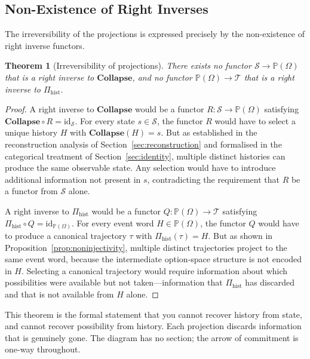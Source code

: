 \documentclass[12pt]{article}
\theoremstyle{plain}
\newtheorem{theorem}{Theorem}[section]
\theoremstyle{definition}
\theoremstyle{remark}
\newcommand{\Collapse}{\mathbf{Collapse}}
\newcommand{\PathCat}{\mathbb{P}(\Omega)}
\begin{document}
\subsection{Non-Existence of Right Inverses}

The irreversibility of the projections is expressed precisely by the
non-existence of right inverse functors.

\begin{theorem}[Irreversibility of projections]
\label{thm:no-right-inverse}
There exists no functor $\mathcal{S} \to \PathCat$ that is a right inverse
to $\Collapse$, and no functor $\PathCat \to \mathcal{T}$ that is a right
inverse to $\Pi_{\mathrm{hist}}$.
\end{theorem}

\begin{proof}
A right inverse to $\Collapse$ would be a functor $R : \mathcal{S} \to \PathCat$
satisfying $\Collapse \circ R = \mathrm{id}_{\mathcal{S}}$.  For every state
$s \in \mathcal{S}$, the functor $R$ would have to select a unique history $H$
with $\Collapse(H) = s$.  But as established in the reconstruction analysis of
Section~\ref{sec:reconstruction} and formalised in the categorical treatment of
Section~\ref{sec:identity}, multiple distinct histories can produce the same
observable state.  Any selection would have to introduce additional information
not present in $s$, contradicting the requirement that $R$ be a functor from
$\mathcal{S}$ alone.

A right inverse to $\Pi_{\mathrm{hist}}$ would be a functor
$Q : \PathCat \to \mathcal{T}$ satisfying $\Pi_{\mathrm{hist}} \circ Q =
\mathrm{id}_{\PathCat}$.  For every event word $H \in \PathCat$, the functor
$Q$ would have to produce a canonical trajectory $\tau$ with
$\Pi_{\mathrm{hist}}(\tau) = H$.  But as shown in
Proposition~\ref{prop:noninjectivity}, multiple distinct trajectories project
to the same event word, because the intermediate option-space structure is not
encoded in $H$.  Selecting a canonical trajectory would require information
about which possibilities were available but not taken---information that
$\Pi_{\mathrm{hist}}$ has discarded and that is not available from $H$ alone.
\end{proof}

This theorem is the formal statement that you cannot recover history from state,
and cannot recover possibility from history.  Each projection discards
information that is genuinely gone.  The diagram has no section; the arrow of
commitment is one-way throughout.
\end{document}
